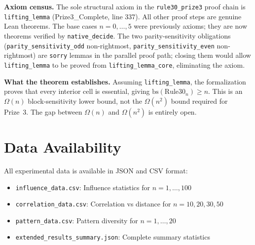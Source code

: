\documentclass[11pt]{article}
\begin{document}
\textbf{Axiom census.} The sole structural axiom in the \texttt{rule30\_prize3} proof chain is \texttt{lifting\_lemma} (Prize3\_Complete, line 337). All other proof steps are genuine Lean theorems. The base cases $n = 0,\ldots,5$ were previously axioms; they are now theorems verified by \texttt{native\_decide}. The two parity-sensitivity obligations (\texttt{parity\_sensitivity\_odd} non-rightmost, \texttt{parity\_sensitivity\_even} non-rightmost) are \texttt{sorry} lemmas in the parallel proof path; closing them would allow \texttt{lifting\_lemma} to be proved from \texttt{lifting\_lemma\_core}, eliminating the axiom.

\textbf{What the theorem establishes.} Assuming \texttt{lifting\_lemma}, the formalization proves that every interior cell is essential, giving $\mathrm{bs}(\mathrm{Rule30}_n) \geq n$. This is an $\Omega(n)$ block-sensitivity lower bound, not the $\Omega(n^2)$ bound required for Prize~3. The gap between $\Omega(n)$ and $\Omega(n^2)$ is entirely open.

\section{Data Availability}

All experimental data is available in JSON and CSV format:
\begin{itemize}
    \item \texttt{influence\_data.csv}: Influence statistics for $n=1,\ldots,100$
    \item \texttt{correlation\_data.csv}: Correlation vs distance for $n=10,20,30,50$
    \item \texttt{pattern\_data.csv}: Pattern diversity for $n=1,\ldots,20$
    \item \texttt{extended\_results\_summary.json}: Complete summary statistics
\end{itemize}
\end{document}
